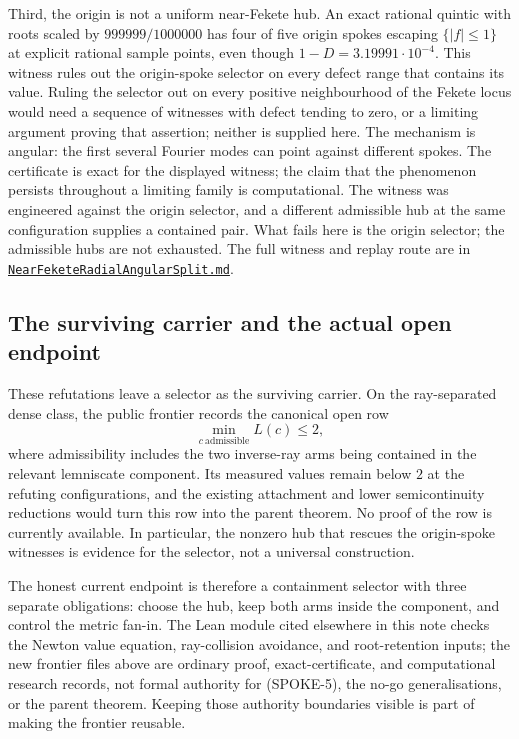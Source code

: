 \documentclass[11pt]{article}
\begin{document}
Third, the origin is not a uniform near-Fekete hub.  An exact rational
quintic with roots scaled by $999999/1000000$ has four of five origin spokes
escaping $\{|f|\le1\}$ at explicit rational sample points, even though
$1-D=3.19991\cdot10^{-4}$.  This witness rules out the origin-spoke selector
on every defect range that contains its value.  Ruling the selector out on
every positive neighbourhood of the Fekete locus would need a sequence of
witnesses with defect tending to zero, or a limiting argument proving that
assertion; neither is supplied here.  The mechanism is angular: the first
several Fourier modes can point against different spokes.  The certificate is
exact for the displayed witness; the claim that the phenomenon persists
throughout a limiting family is computational.  The witness was engineered
against the origin selector, and a different admissible hub at the same
configuration supplies a contained pair.  What fails here is the origin
selector; the admissible hubs are not exhausted.  The full witness and replay route are in
\href{https://github.com/wcook04/plectis-erdos/blob/f214a6b45528dc5eefe20ffadc35f2e981627d4c/research_corpus/Erdos1041/NearFeketeRadialAngularSplit.md}{\texttt{NearFeketeRadialAngularSplit.md}}.

\subsection*{The surviving carrier and the actual open endpoint}

These refutations leave a selector as the surviving carrier.  On the
ray-separated dense class, the public frontier records the canonical open row
\[
  \min_{c\ \mathrm{admissible}} L(c)\le2,
\]
where admissibility includes the two inverse-ray arms being contained in the
relevant lemniscate component.  Its measured values remain below $2$ at the
refuting configurations, and the existing attachment and lower
semicontinuity reductions would turn this row into the parent theorem.  No
proof of the row is currently available.  In particular, the nonzero hub
that rescues the origin-spoke witnesses is evidence for the selector, not a
universal construction.

The honest current endpoint is therefore a containment selector with three
separate obligations: choose the hub, keep both arms inside the component,
and control the metric fan-in.  The Lean module cited elsewhere in this note
checks the Newton value equation, ray-collision avoidance, and root-retention
inputs; the new frontier files above are ordinary proof, exact-certificate,
and computational research records, not formal authority for (SPOKE-5), the
no-go generalisations, or the parent theorem.  Keeping those authority
boundaries visible is part of making the frontier reusable.
\end{document}
